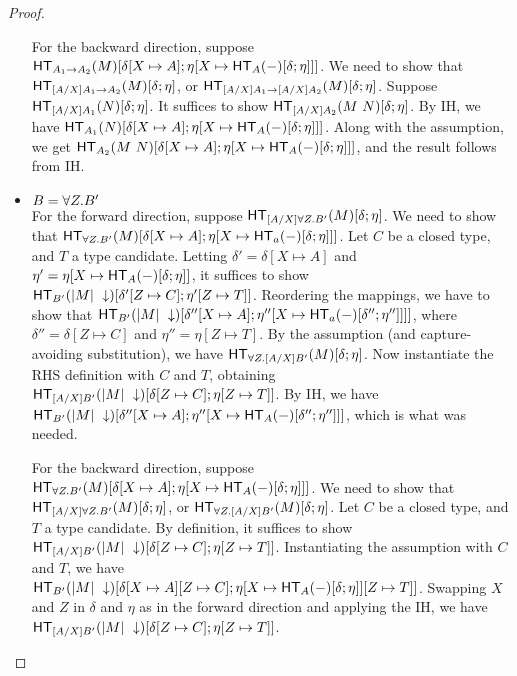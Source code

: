 \documentclass{article}
\begin{document}
\begin{proof}
\begin{itemize}
For the backward direction, suppose
$\mathsf{HT}_{A_1 \to A_2}(M)[\delta[X \mapsto A];\eta[X \mapsto \mathsf{HT}_{A}(-)[\delta;\eta]]]$.
We need to show that $\mathsf{HT}_{[A/X]A_1 \to A_2}(M)[\delta;\eta]$,
or $\mathsf{HT}_{[A/X]A_1 \to [A/X]A_2}(M)[\delta;\eta]$. Suppose $\mathsf{HT}_{[A/X]A_1}(N)[\delta;\eta]$.
It suffices to show $\mathsf{HT}_{[A/X]A_2}(M\ N)[\delta;\eta]$. By IH, we have
$\mathsf{HT}_{A_1}(N)[\delta[X \mapsto A];\eta[X \mapsto \mathsf{HT}_{A}(-)[\delta;\eta]]]$.
Along with the assumption, we get $\mathsf{HT}_{A_2}(M\ N)[\delta[X \mapsto A];\eta[X \mapsto \mathsf{HT}_{A}(-)[\delta;\eta]]]$, and the result follows from IH.

\item $B = \forall Z. B'$\\
For the forward direction, suppose $\mathsf{HT}_{[A/X]\forall Z. B'}(M)[\delta;\eta]$. We need to show that
$\mathsf{HT}_{\forall Z. B'}(M)[\delta[X \mapsto A];\eta[X \mapsto \mathsf{HT}_{a}(-)[\delta;\eta]]]$. Let $C$ be a closed type,
and $T$ a type candidate. Letting $\delta' = \delta[X \mapsto A]$ and
$\eta' = \eta[X \mapsto \mathsf{HT}_{A}(-)[\delta;\eta]]$, it suffices to show
$\mathsf{HT}_{B'}(|M|\ \downarrow)[\delta'[Z \mapsto C];\eta'[Z \mapsto T]]$.
Reordering the mappings, we have to show that 
$\mathsf{HT}_{B'}(|M|\ \downarrow)[\delta''[X \mapsto A];\eta''[X \mapsto \mathsf{HT}_{a}(-)[\delta'';\eta'']]]]$, where $\delta'' = \delta[Z \mapsto C]$ and $\eta'' = \eta[Z \mapsto T]$.
By the assumption (and
capture-avoiding substitution), we have $\mathsf{HT}_{\forall Z. [A/X]B'}(M)[\delta;\eta]$.
Now instantiate the RHS definition with $C$ and $T$, obtaining
$\mathsf{HT}_{[A/X]B'}(|M|\ \downarrow)[\delta[Z \mapsto C];\eta[Z \mapsto T]]$.
By IH, we have
$\mathsf{HT}_{B'}(|M|\ \downarrow)[\delta''[X \mapsto A];\eta''[X \mapsto \mathsf{HT}_{A}(-)[\delta'';\eta'']]]$,
which is what was needed. 

For the backward direction, suppose
$\mathsf{HT}_{\forall Z. B'}(M)[\delta[X \mapsto A];\eta[X \mapsto \mathsf{HT}_{A}(-)[\delta;\eta]]]$.
We need to show that $\mathsf{HT}_{[A/X]\forall Z. B'}(M)[\delta;\eta]$, or $\mathsf{HT}_{\forall Z. [A/X]B'}(M)[\delta;\eta]$.
Let $C$ be a closed type, and $T$ a type candidate. By definition, it suffices
to show $\mathsf{HT}_{[A/X]B'}(|M|\ \downarrow)[\delta[Z \mapsto C];\eta[Z \mapsto T]]$.
Instantiating the assumption with $C$ and $T$, we have $\mathsf{HT}_{B'}(|M|\ \downarrow)[\delta[X \mapsto A][Z \mapsto C];\eta[X \mapsto \mathsf{HT}_{A}(-)[\delta;\eta]][Z \mapsto T]]$.
Swapping $X$ and $Z$ in $\delta$ and $\eta$ as in the forward direction and applying the IH, we have $\mathsf{HT}_{[A/X]B'}(|M|\ \downarrow)[\delta[Z \mapsto C];\eta[Z \mapsto T]]$. 
\end{itemize}
\end{proof}
\end{document}
